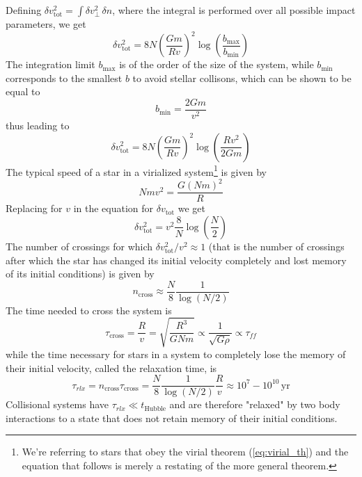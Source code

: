 Defining $\delta v^{2}_{\text{tot}} = \int \delta v^{2}_{\perp}\,\delta n$, where the integral is performed over all possible impact parameters, we get
\begin{equation*}
    \delta v^{2}_{\text{tot}} = 8N\left(\frac{Gm}{Rv}\right)^{2}\log\left(\frac{b_{\text{max}}}{b_{\text{min}}}\right)
\end{equation*}
The integration limit $b_{\text{max}}$ is of the order of the size of the system, while $b_{\text{min}}$ corresponds to the smallest $b$ to avoid stellar collisons, which can be shown to be equal to 
\begin{equation*}
    b_{\text{min}} = \frac{2Gm}{v^{2}}
\end{equation*}
thus leading to 
\begin{equation*}
     \delta v^{2}_{\text{tot}} = 8N\left(\frac{Gm}{Rv}\right)^{2}\log\left(\frac{Rv^{2}}{2Gm}\right)
\end{equation*}
The typical speed of a star in a virialized system\footnote{We're referring to stars that obey the virial theorem (\ref{eq:virial_th}) and the equation that follows is merely a restating of the more general theorem.} is given by
\begin{equation*}
    Nmv^{2} = \frac{G(Nm)^{2}}{R}
\end{equation*}
Replacing for $v$ in the equation for $\delta v_{\text{tot}}$ we get 
\begin{equation*}
    \delta v^{2}_{\text{tot}} = v^{2}\frac{8}{N}\log\left(\frac{N}{2}\right)
\end{equation*}
The number of crossings for which $\delta v^{2}_{\text{tot}}/v^{2} \approx 1$ (that is the number of crossings after which the star has changed its initial velocity completely and lost memory of its initial conditions) is given by
\begin{equation*}
    n_{\text{cross}}\approx\frac{N}{8}\frac{1}{\log(N/2)}
\end{equation*}
The time needed to cross the system is 
\begin{equation*}
    \tau_{\text{cross}} = \frac{R}{v} = \sqrt{\frac{R^{3}}{GNm}} \propto \frac{1}{\sqrt{G\rho}}\propto \tau_{ff}
\end{equation*}
while the time necessary for stars in a system to completely lose the memory of their initial velocity, called the relaxation time, is
\begin{equation}
    \tau_{rlx} = n_{\text{cross}}\tau_{\text{cross}} = \frac{N}{8}\frac{1}{\log(N/2)}\frac{R}{v}\approx 10^{7}-10^{10}\,\text{yr}
    \label{eq:relaxation_time}
\end{equation}
Collisional systems have $\tau_{rlx}\ll t_{\text{Hubble}}$ and are therefore "relaxed" by two body interactions to a state that does not retain memory of their initial conditions.
